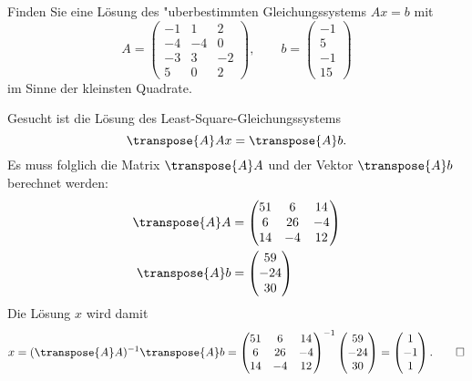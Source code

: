 Finden Sie eine Lösung des "uberbestimmten Gleichungssystems $Ax=b$ mit 
\[
A=\begin{pmatrix}
-1& 1& 2\\
-4&-4& 0\\
-3& 3&-2\\
 5& 0& 2
\end{pmatrix},
\qquad
b=\begin{pmatrix}
-1\\5\\-1\\15
\end{pmatrix}
\]
im Sinne der kleinsten Quadrate.


\begin{loesung}
Gesucht ist die Lösung des Least-Square-Gleichungssystems
\[
 \transpose{A}A x= \transpose{A}b.
\]
Es muss folglich die Matrix $\transpose{A}A$ und der Vektor $\transpose{A}b$
berechnet werden:
\begin{align*}
\transpose{A}A
&=
\begin{pmatrix}
   51 &  6 & 14 \\
    6 & 26 & -4 \\
   14 & -4 & 12
\end{pmatrix}
\\
\transpose{A}b
&=
\begin{pmatrix}
59\\-24\\30
\end{pmatrix}
\end{align*}
Die Lösung $x$ wird damit
\[
x
=
(\transpose{A}A)^{-1} \transpose{A}b
=
\begin{pmatrix}
   51 &  6 & 14 \\
    6 & 26 & -4 \\
   14 & -4 & 12
\end{pmatrix}^{-1}
\begin{pmatrix}
59\\-24\\30
\end{pmatrix}
=
\begin{pmatrix} 1\\-1\\1 \end{pmatrix}.\qedhere
\]
\end{loesung}


